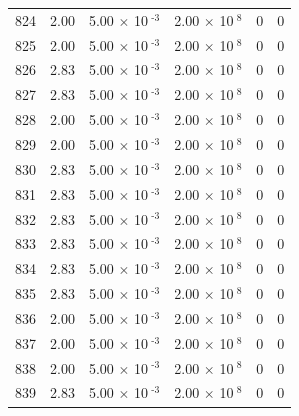 \documentclass[a4paper,11pt]{article}
\begin{document}
\begin{center}
\begin{longtable}{|R{1.5cm}|R{2.4cm}|R{2.4cm}|R{2.4cm}|R{2.4cm}|R{2.4cm}|}
  824 &   2.00  &         5.00 $\times$ 10$^{\text{          -3}}$  &         2.00 $\times$ 10$^{\text{           8}}$  & 0  & 0 \\
  825 &   2.00  &         5.00 $\times$ 10$^{\text{          -3}}$  &         2.00 $\times$ 10$^{\text{           8}}$  & 0  & 0 \\
  826 &   2.83  &         5.00 $\times$ 10$^{\text{          -3}}$  &         2.00 $\times$ 10$^{\text{           8}}$  & 0  & 0 \\
  827 &   2.83  &         5.00 $\times$ 10$^{\text{          -3}}$  &         2.00 $\times$ 10$^{\text{           8}}$  & 0  & 0 \\
  828 &   2.00  &         5.00 $\times$ 10$^{\text{          -3}}$  &         2.00 $\times$ 10$^{\text{           8}}$  & 0  & 0 \\
  829 &   2.00  &         5.00 $\times$ 10$^{\text{          -3}}$  &         2.00 $\times$ 10$^{\text{           8}}$  & 0  & 0 \\
  830 &   2.83  &         5.00 $\times$ 10$^{\text{          -3}}$  &         2.00 $\times$ 10$^{\text{           8}}$  & 0  & 0 \\
  831 &   2.83  &         5.00 $\times$ 10$^{\text{          -3}}$  &         2.00 $\times$ 10$^{\text{           8}}$  & 0  & 0 \\
  832 &   2.83  &         5.00 $\times$ 10$^{\text{          -3}}$  &         2.00 $\times$ 10$^{\text{           8}}$  & 0  & 0 \\
  833 &   2.83  &         5.00 $\times$ 10$^{\text{          -3}}$  &         2.00 $\times$ 10$^{\text{           8}}$  & 0  & 0 \\
  834 &   2.83  &         5.00 $\times$ 10$^{\text{          -3}}$  &         2.00 $\times$ 10$^{\text{           8}}$  & 0  & 0 \\
  835 &   2.83  &         5.00 $\times$ 10$^{\text{          -3}}$  &         2.00 $\times$ 10$^{\text{           8}}$  & 0  & 0 \\
  836 &   2.00  &         5.00 $\times$ 10$^{\text{          -3}}$  &         2.00 $\times$ 10$^{\text{           8}}$  & 0  & 0 \\
  837 &   2.00  &         5.00 $\times$ 10$^{\text{          -3}}$  &         2.00 $\times$ 10$^{\text{           8}}$  & 0  & 0 \\
  838 &   2.00  &         5.00 $\times$ 10$^{\text{          -3}}$  &         2.00 $\times$ 10$^{\text{           8}}$  & 0  & 0 \\
  839 &   2.83  &         5.00 $\times$ 10$^{\text{          -3}}$  &         2.00 $\times$ 10$^{\text{           8}}$  & 0  & 0 \\

\end{longtable}
\end{center}
\end{document}
